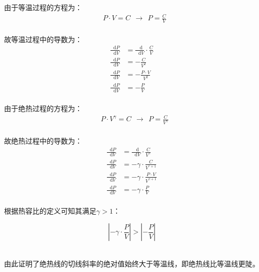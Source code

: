 \documentclass[UTF8]{ctexart}
\newcommand*{\dif}{\mathop{}\!\mathrm{d}}
\begin{document}
    由于等温过程的方程为：
    \begin{align}
        &P\cdot V=C~~\rightarrow~~P=\frac{C}{V}
    \end{align}\\
    故等温过程中的导数为：
    \begin{align}
        \frac{\dif P}{\dif V}&=\frac{\dif}{\dif V}\cdot\frac{C}{V}\\[3mm]
        \frac{\dif P}{\dif V}&=-\frac{C}{V^2}\\[3mm]
        \frac{\dif P}{\dif V}&=-\frac{P\cdot V}{V^2}\\[3mm]
        \frac{\dif P}{\dif V}&=-\frac{P}{V}
    \end{align}\\
    由于绝热过程的方程为：
    \begin{align}
        &P\cdot V^{\gamma}=C~~\rightarrow~~P=\frac{C}{V^{\gamma}}
    \end{align}\\
    故绝热过程中的导数为：
    \begin{align}
        \frac{\dif P}{\dif V}&=\frac{\dif}{\dif V}\cdot\frac{C}{V^{\gamma}}\\[3mm]
        \frac{\dif P}{\dif V}&=-\gamma\cdot\frac{C}{V^{^{\gamma}+1}}\\[3mm]
        \frac{\dif P}{\dif V}&=-\gamma\cdot\frac{P\cdot V}{V^{\gamma+1}}\\[3mm]
        \frac{\dif P}{\dif V}&=-\gamma\cdot\frac{P}{V}
    \end{align}\\
    根据热容比的定义可知其满足$\gamma>1$：\vspace{3pt}
    \begin{large}
        \begin{equation*}
            \left|-\gamma\cdot\frac{P}{V}\right|>\left|-\frac{P}{V}\right|
        \end{equation*}
    \end{large}\\
    由此证明了绝热线的切线斜率的绝对值始终大于等温线，即绝热线比等温线更陡。

\newpage
\end{document}
